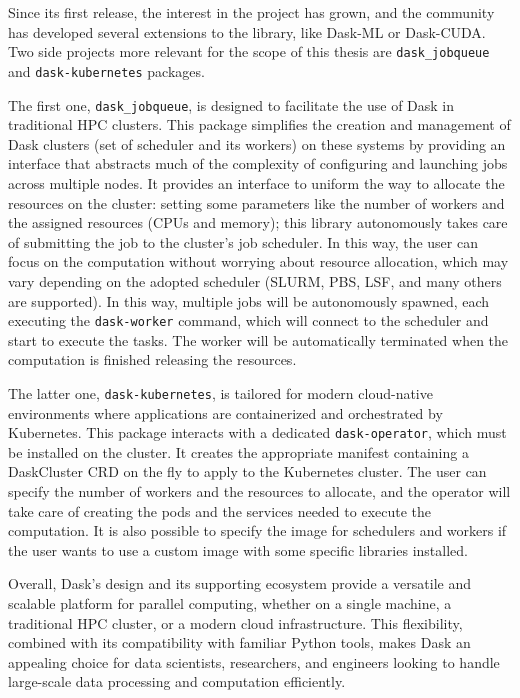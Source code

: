 Since its first release, the interest in the project has grown, and the
community has developed several extensions to the library, like Dask-ML or
Dask-CUDA.
Two side projects more relevant for the scope of this thesis are
\texttt{dask\_jobqueue} and \texttt{dask-kubernetes} packages.

The first one, \texttt{dask\_jobqueue}, is designed to facilitate the use of
Dask in traditional HPC clusters.
This package simplifies the creation and management of Dask clusters (set of
scheduler and its workers) on these systems by providing an interface that
abstracts much of the complexity of configuring and launching jobs across
multiple nodes.
It provides an interface to uniform the way to allocate the resources on the
cluster: setting some parameters like the number of workers and the assigned
resources (CPUs and memory); this library autonomously takes care of submitting
the job to the cluster's job scheduler.
In this way, the user can focus on the computation without worrying about
resource allocation, which may vary depending on the adopted scheduler (SLURM,
PBS, LSF, and many others are supported).
In this way, multiple jobs will be autonomously spawned, each executing the
\texttt{dask-worker} command, which will connect to the scheduler and start to
execute the tasks. The worker will be automatically terminated when the
computation is finished releasing the resources.

The latter one, \texttt{dask-kubernetes}, is tailored for modern cloud-native
environments where applications are containerized and orchestrated by
Kubernetes.
This package interacts with a dedicated \texttt{dask-operator}, which must be
installed on the cluster. It creates the appropriate manifest containing a
DaskCluster CRD on the fly to apply to the Kubernetes cluster.
The user can specify the number of workers and the resources to allocate, and
the operator will take care of creating the pods and the services needed to
execute the computation.
It is also possible to specify the image for schedulers and workers if the user
wants to use a custom image with some specific libraries installed.

Overall, Dask's design and its supporting ecosystem provide a versatile and
scalable platform for parallel computing, whether on a single machine, a
traditional HPC cluster, or a modern cloud infrastructure. This flexibility,
combined with its compatibility with familiar Python tools, makes Dask an
appealing choice for data scientists, researchers, and engineers looking to
handle large-scale data processing and computation efficiently.

